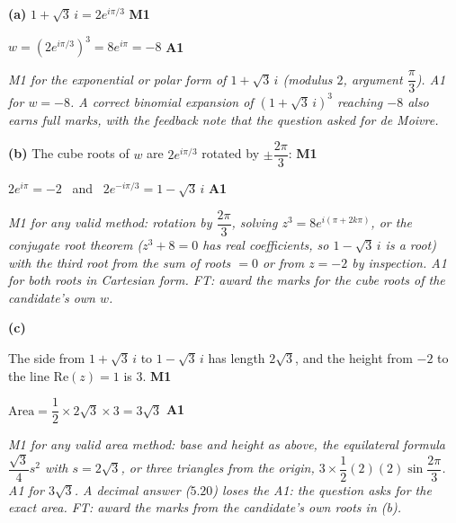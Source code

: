 \documentclass[12pt, twoside]{article}
\begin{document}
\begin{enumerate}[itemsep=0.3cm]
\textbf{(a)} $1 + \sqrt{3}\,i = 2e^{i\pi/3}$ \hfill \textbf{M1}

$w = \left(2e^{i\pi/3}\right)^{3} = 8e^{i\pi} = -8$ \hfill \textbf{A1}

\emph{M1 for the exponential or polar form of $1 + \sqrt{3}\,i$ (modulus $2$,
argument $\dfrac{\pi}{3}$). A1 for $w = -8$. A correct binomial expansion of
$(1 + \sqrt{3}\,i)^{3}$ reaching $-8$ also earns full marks, with the feedback
note that the question asked for de Moivre.}

\textbf{(b)} The cube roots of $w$ are $2e^{i\pi/3}$ rotated by
$\pm\dfrac{2\pi}{3}$: \hfill \textbf{M1}

$2e^{i\pi} = -2$ \ and \ $2e^{-i\pi/3} = 1 - \sqrt{3}\,i$ \hfill \textbf{A1}

\emph{M1 for any valid method: rotation by $\dfrac{2\pi}{3}$, solving
$z^{3} = 8e^{i(\pi + 2k\pi)}$, or the conjugate root theorem ($z^{3} + 8 = 0$
has real coefficients, so $1 - \sqrt{3}\,i$ is a root) with the third root
from the sum of roots $= 0$ or from $z = -2$ by inspection. A1 for both roots
in Cartesian form. FT: award the marks for the cube roots of the candidate's
own $w$.}

\textbf{(c)}

\begin{center}
\end{center}

The side from $1 + \sqrt{3}\,i$ to $1 - \sqrt{3}\,i$ has length $2\sqrt{3}$,
and the height from $-2$ to the line $\mathrm{Re}(z) = 1$ is $3$.
\hfill \textbf{M1}

$\text{Area} = \dfrac{1}{2} \times 2\sqrt{3} \times 3 = 3\sqrt{3}$
\hfill \textbf{A1}

\emph{M1 for any valid area method: base and height as above, the equilateral
formula $\dfrac{\sqrt{3}}{4}s^{2}$ with $s = 2\sqrt{3}$, or three triangles from
the origin, $3 \times \dfrac{1}{2}(2)(2)\sin\dfrac{2\pi}{3}$. A1 for
$3\sqrt{3}$. A decimal answer ($5.20$) loses the A1: the question asks for the
exact area. FT: award the marks from the candidate's own roots in (b).}

\end{enumerate}
\end{document}
